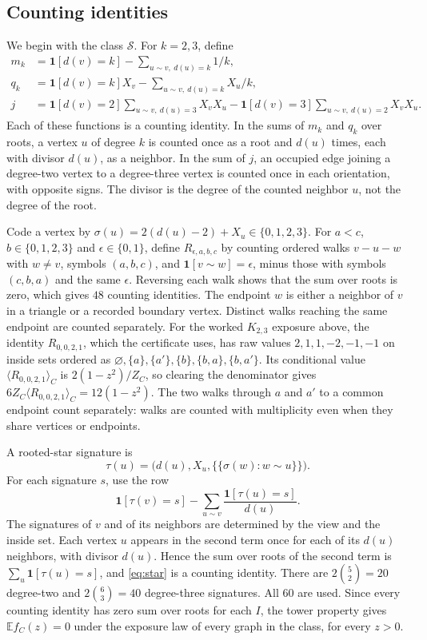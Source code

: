\documentclass[11pt]{article}
\newcommand{\E}{\mathbb E}\newcommand{\Prob}{\mathbb P}
\newcommand{\ind}{\mathbf1}\newcommand{\F}{\mathcal F}\newcommand{\V}{\mathcal V}
\begin{document}
\subsection{Counting identities}
We begin with the class $\mathcal S$. For $k=2,3$, define
\begin{align*}
 m_k&=\ind[d(v)=k]-\sum_{u\sim v,\ d(u)=k}1/k,\\
 q_k&=\ind[d(v)=k]X_v-\sum_{u\sim v,\ d(u)=k}X_u/k,\\
 j&=\ind[d(v)=2]\sum_{u\sim v,\ d(u)=3}X_vX_u
 -\ind[d(v)=3]\sum_{u\sim v,\ d(u)=2}X_vX_u.
\end{align*}
Each of these functions is a counting identity. In the sums of $m_k$ and $q_k$ over roots, a vertex $u$ of degree $k$ is counted once as a root and $d(u)$ times, each with divisor $d(u)$, as a neighbor. In the sum of $j$, an occupied edge joining a degree-two vertex to a degree-three vertex is counted once in each orientation, with opposite signs. The divisor is the degree of the counted neighbor $u$, not the degree of the root.

Code a vertex by $\sigma(u)=2(d(u)-2)+X_u\in\{0,1,2,3\}$. For $a<c$, $b\in\{0,1,2,3\}$ and $\epsilon\in\{0,1\}$, define $R_{\epsilon,a,b,c}$ by counting ordered walks $v-u-w$ with $w\ne v$, symbols $(a,b,c)$, and $\ind[v\sim w]=\epsilon$, minus those with symbols $(c,b,a)$ and the same $\epsilon$. Reversing each walk shows that the sum over roots is zero, which gives $48$ counting identities. The endpoint $w$ is either a neighbor of $v$ in a triangle or a recorded boundary vertex. Distinct walks reaching the same endpoint are counted separately.
For the worked $K_{2,3}$ exposure above, the identity $R_{0,0,2,1}$, which the certificate uses, has raw values $2,1,1,-2,-1,-1$ on inside sets ordered as $\varnothing,\{a\},\{a'\},\{b\},\{b,a\},\{b,a'\}$. Its conditional value $\langle R_{0,0,2,1}\rangle_C$ is $2(1-z^2)/Z_C$, so clearing the denominator gives $6Z_C\langle R_{0,0,2,1}\rangle_C=12(1-z^2)$. The two walks through $a$ and $a'$ to a common endpoint count separately: walks are counted with multiplicity even when they share vertices or endpoints.


A rooted-star signature is
\[
 \tau(u)=\bigl(d(u),X_u,\{\!\{\sigma(w):w\sim u\}\!\}\bigr).
\]
For each signature $s$, use the row
\begin{equation}\label{eq:star}
 \ind[\tau(v)=s]-\sum_{u\sim v}\frac{\ind[\tau(u)=s]}{d(u)}.
\end{equation}
The signatures of $v$ and of its neighbors are determined by the view and the inside set. Each vertex $u$ appears in the second term once for each of its $d(u)$ neighbors, with divisor $d(u)$. Hence the sum over roots of the second term is $\sum_u\ind[\tau(u)=s]$, and \eqref{eq:star} is a counting identity. There are $2\binom52=20$ degree-two and $2\binom63=40$ degree-three signatures. All $60$ are used. Since every counting identity has zero sum over roots for each $I$, the tower property gives $\E f_C(z)=0$ under the exposure law of every graph in the class, for every $z>0$.
\end{document}
